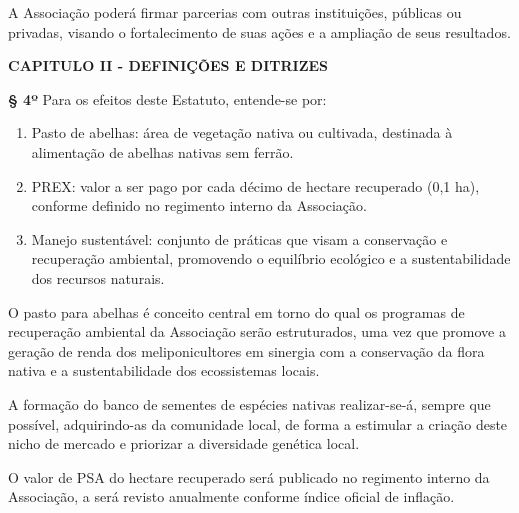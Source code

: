 \documentclass[12pt]{article}
\newcommand{\capitulo}[1]{\vspace{1.0em}\begin{center}\fontseries{b}\selectfont\textbf{\MakeUppercase{#1}}\end{center}}
\newcommand{\artigo}[1]{\vspace{1.0em}\noindent\textbf{#1}\hspace{0.75em}}
\newcommand{\paragrafo}[1]{\vspace{1.0em}\noindent{#1}\hspace{0.75em}}
\begin{document}
\paragrafo{§ 2º} A Associação poderá firmar parcerias com outras instituições, públicas ou privadas, visando o fortalecimento de suas ações e a ampliação de seus resultados.


\capitulo{Capitulo II - Definições e ditrizes}

\artigo{§ 4º} Para os efeitos deste Estatuto, entende-se por:
\begin{enumerate}[label=\Roman* -]
  \item Pasto de abelhas: área de vegetação nativa ou cultivada, destinada à alimentação de abelhas nativas sem ferrão.
  \item PREX: valor a ser pago por cada décimo de hectare recuperado (0,1 ha), conforme definido no regimento interno da Associação.
  \item Manejo sustentável: conjunto de práticas que visam a conservação e recuperação ambiental, promovendo o equilíbrio ecológico e a sustentabilidade dos recursos naturais.
\end{enumerate}

\paragrafo{§ 3º} O pasto para abelhas é conceito central em torno do qual os programas de recuperação ambiental da Associação serão estruturados, uma vez que promove a geração de renda dos meliponicultores em sinergia com a conservação da flora nativa e a sustentabilidade dos ecossistemas locais.

\paragrafo{§ 3º} A formação do banco de sementes de espécies nativas realizar-se-á, sempre que possível, adquirindo-as da comunidade local, de forma a estimular a criação deste nicho de mercado e priorizar a diversidade genética local.

\paragrafo{§ 4º} O valor de PSA do hectare recuperado será publicado no regimento interno da Associação, a será revisto anualmente conforme índice oficial de inflação.








\end{document}
